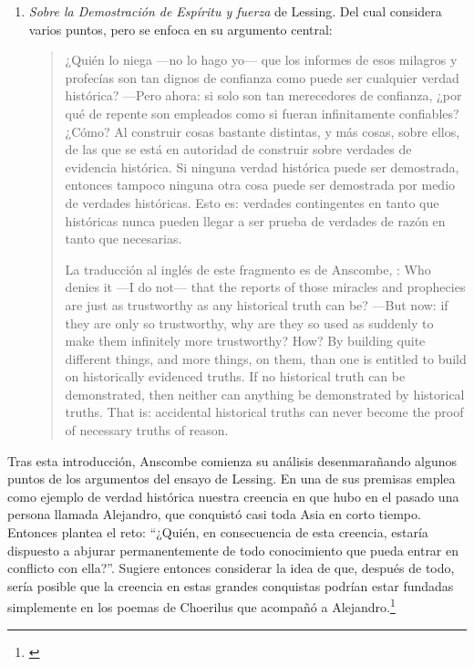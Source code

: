 \begin{enumerate}
\item \emph{Sobre la Demostración de Espíritu y fuerza} de Lessing. Del cual
  considera varios puntos, pero se enfoca en su argumento central:
  \blockquote[La traducción al inglés de este fragmento es de Anscombe,
  {\cite[Cf.~][22]{anscombe2008faith:prophandmi}}: Who denies it ---I do not---
  that the reports of those miracles and prophecies are just as trustworthy as
  any historical truth can be? ---But now: if they are only so trustworthy, why
  are they so used as suddenly to make them infinitely more trustworthy? How? By
  building quite different things, and more things, on them, than one is
  entitled to build on historically evidenced truths. If no historical truth can
  be demonstrated, then neither can anything be demonstrated by historical
  truths. That is: accidental historical truths can never become the proof of
  necessary truths of reason.]{¿Quién lo niega ---no lo hago yo--- que los
    informes de esos milagros y profecías son tan dignos de confianza como puede
    ser cualquier verdad histórica? ---Pero ahora: si solo son tan merecedores
    de confianza, ¿por qué de repente son empleados como si fueran infinitamente
    confiables? ¿Cómo? Al construir cosas bastante distintas, y más cosas, sobre
    ellos, de las que se está en autoridad de construir sobre verdades de
    evidencia histórica. Si ninguna verdad histórica puede ser demostrada,
    entonces tampoco ninguna otra cosa puede ser demostrada por medio de
    verdades históricas. Esto es: verdades contingentes en tanto que históricas
    nunca pueden llegar a ser prueba de verdades de razón en tanto que
    necesarias.}
\end{enumerate}

Tras esta introducción, Anscombe comienza su análisis desenmarañando algunos
puntos de los argumentos del ensayo de Lessing. En una de sus premisas emplea
como ejemplo de verdad histórica nuestra creencia en que hubo en el pasado una
persona llamada Alejandro, que conquistó casi toda Asia en corto tiempo.
Entonces plantea el reto: \enquote{¿Quién, en consecuencia de esta creencia,
  estaría dispuesto a abjurar permanentemente de todo conocimiento que pueda
  entrar en conflicto con ella?}. Sugiere entonces considerar la idea de que,
después de todo, sería posible que la creencia en estas grandes conquistas
podrían estar fundadas simplemente en los poemas de Choerilus que acompañó a
Alejandro.\footnote{\cite[Cf.~][448]{lessing1982escritos:demo}}

